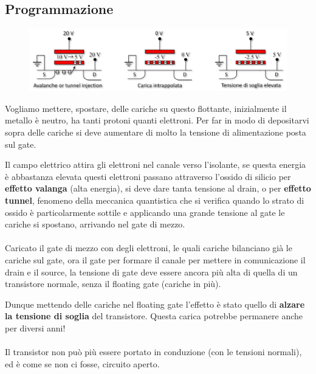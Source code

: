 \subsection{Programmazione}

\begin{figure}[htbp]
    \centering
    \includegraphics[width=0.7\linewidth]{img/hmg.png}
\end{figure}

Vogliamo mettere, spostare, delle cariche su questo flottante, inizialmente il metallo è neutro, ha tanti protoni quanti elettroni. Per far in modo di depositarvi sopra delle cariche si deve aumentare di molto la tensione di alimentazione posta sul gate.

 Il campo elettrico attira gli elettroni nel canale verso l'isolante, se questa energia è abbastanza elevata questi elettroni passano attraverso l'ossido di silicio per \textbf{effetto valanga} (alta energia), si deve dare tanta tensione al drain,  o per \textbf{effetto tunnel}, fenomeno della meccanica quantistica che si verifica quando lo strato di ossido è particolarmente sottile e applicando una grande tensione al gate le cariche si spostano,  arrivando nel gate di mezzo.

 \paragraph{}
 Caricato il gate di mezzo con degli elettroni, le quali cariche bilanciano già le cariche sul gate, ora il gate per formare il canale per mettere in comunicazione il drain e il source, la tensione di gate deve essere ancora più alta di quella di un transistore normale, senza il floating gate (cariche in più). 
 
 Dunque mettendo delle cariche nel floating gate l'effetto è stato quello di \textbf{alzare la tensione di soglia} del transistore. Questa carica potrebbe permanere anche per diversi anni!

 \paragraph{}
 Il transistor non può più essere portato in conduzione (con le
tensioni normali), ed è come se non ci fosse, circuito aperto.


